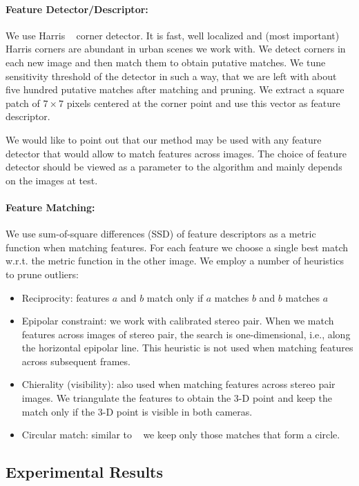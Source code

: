\documentclass{report}
\begin{document}
\paragraph{Feature Detector/Descriptor:} We use Harris
~\cite{Harris1988} corner detector. It is fast, well localized and
(most important) Harris corners are abundant in urban scenes we work
with. We detect corners in each new image and then match them to
obtain putative matches.  We tune sensitivity threshold of the
detector in such a way, that we are left with about five hundred
putative matches after matching and pruning.  We extract a square
patch of $7\times 7$ pixels centered at the corner point and use this
vector as feature descriptor.

We would like to point out that our method may be used with any
feature detector that would allow to match features across images. The
choice of feature detector should be viewed as a parameter to the
algorithm and mainly depends on the images at test.

\paragraph{Feature Matching:} We use sum-of-square differences (SSD)
of feature descriptors as a metric function when matching
features. For each feature we choose a single best match w.r.t. the
metric function in the other image. We employ a number of heuristics
to prune outliers:
\begin{itemize}
\item Reciprocity: features $a$ and $b$ match only if $a$ matches $b$
  and $b$ matches $a$
\item Epipolar constraint: we work with calibrated stereo pair.  When
  we match features across images of stereo pair, the search is
  one-dimensional, i.e., along the horizontal epipolar line.  This
  heuristic is not used when matching features across subsequent
  frames.
\item Chierality (visibility): also used when matching features across
  stereo pair images.  We triangulate the features to obtain the 3-D
  point and keep the match only if the 3-D point is visible in both
  cameras.
\item Circular match: similar to ~\cite{Geiger2011} we keep only those
  matches that form a circle.
\end{itemize}

\subsection{Experimental Results}
\end{document}
